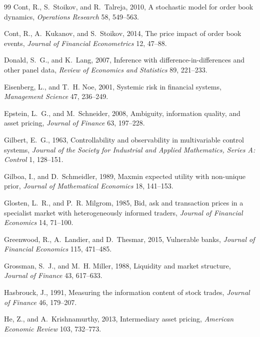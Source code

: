\documentclass[12pt]{article}
\theoremstyle{definition}
\theoremstyle{remark}
\begin{document}
\begin{thebibliography}{99}
Cont, R., S.~Stoikov, and R.~Talreja, 2010, A stochastic model for order book dynamics, \emph{Operations Research} 58, 549--563.

Cont, R., A.~Kukanov, and S.~Stoikov, 2014, The price impact of order book events, \emph{Journal of Financial Econometrics} 12, 47--88.

Donald, S.~G., and K.~Lang, 2007, Inference with difference-in-differences and other panel data, \emph{Review of Economics and Statistics} 89, 221--233.

Eisenberg, L., and T.~H. Noe, 2001, Systemic risk in financial systems, \emph{Management Science} 47, 236--249.

Epstein, L.~G., and M.~Schneider, 2008, Ambiguity, information quality, and asset pricing, \emph{Journal of Finance} 63, 197--228.

Gilbert, E.~G., 1963, Controllability and observability in multivariable control systems, \emph{Journal of the Society for Industrial and Applied Mathematics, Series A: Control} 1, 128--151.

Gilboa, I., and D.~Schmeidler, 1989, Maxmin expected utility with non-unique prior, \emph{Journal of Mathematical Economics} 18, 141--153.

Glosten, L.~R., and P.~R. Milgrom, 1985, Bid, ask and transaction prices in a specialist market with heterogeneously informed traders, \emph{Journal of Financial Economics} 14, 71--100.

Greenwood, R., A.~Landier, and D.~Thesmar, 2015, Vulnerable banks, \emph{Journal of Financial Economics} 115, 471--485.

Grossman, S.~J., and M.~H. Miller, 1988, Liquidity and market structure, \emph{Journal of Finance} 43, 617--633.

Hasbrouck, J., 1991, Measuring the information content of stock trades, \emph{Journal of Finance} 46, 179--207.

He, Z., and A.~Krishnamurthy, 2013, Intermediary asset pricing, \emph{American Economic Review} 103, 732--773.


\end{thebibliography}
\end{document}
